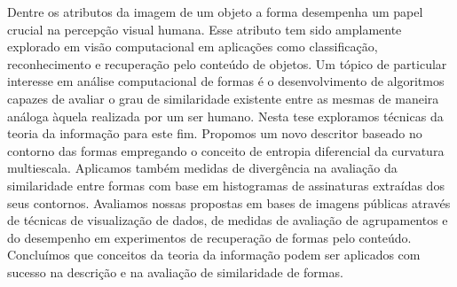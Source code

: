 
Dentre os atributos da imagem de um objeto a forma desempenha um papel crucial na percepção visual humana. Esse atributo tem sido amplamente explorado em visão computacional em aplicações como classificação, reconhecimento e recuperação pelo conteúdo de objetos. Um tópico de particular interesse em análise computacional de formas é o desenvolvimento de algoritmos capazes de avaliar o grau de similaridade existente entre as mesmas de maneira análoga àquela realizada por um ser humano. Nesta tese exploramos técnicas da teoria da informação para este fim. Propomos um novo descritor baseado no contorno das formas empregando o conceito de entropia diferencial da curvatura multiescala. Aplicamos também medidas de divergência na avaliação da similaridade entre formas com base em histogramas de assinaturas extraídas dos seus contornos. Avaliamos nossas propostas em bases de imagens públicas através de técnicas de visualização de dados, de medidas de avaliação de agrupamentos e do desempenho em experimentos de recuperação de formas pelo conteúdo. Concluímos que conceitos da teoria da informação podem ser aplicados com sucesso na descrição e na avaliação de similaridade de formas.

\begin{comment}
A popularização dos dispositivos portáteis de aquisição de imagens tem contribuído para um grande volume de informação multimídia disponível na internet. Dada a limitação dos tradicionais motores de busca em organizar e acessar tal volume de informação, os sistemas de recuperação de imagens através do conteúdo (\emph{CBIR}) despontam como uma proposta promissora para essa finalidade. Esses sistemas realizam buscas por imagens a partir do conteúdo visual para recuperar aquelas que sejam de interesse do usuário. Dois tópicos são de grande relevância em \emph{CBIR}: os métodos de extração de características das imagens e as medidas para avaliação de similaridade. Divergentes estocásticos são funcionais que medem a similaridade entre distribuições de probabilidades. Embora frequentemente aplicados em estatística, teoria da informação e processamento de sinais, a aplicação de divergentes em \emph{CBIR} tem sido pouco explorado. Este trabalho se propõe a investigar a aplicação de tais medidas na avaliação de similaridade de imagens através de características extraídas do contorno da forma. Tendo como descritores os histogramas de assinaturas do contorno das formas, foram conduzidos experimentos de recuperação de imagens pelo conteúdo em bases de imagens binárias empregando-se tais medidas. Os resultados dessa investigação demonstram que a avaliação de similaridade de formas em experimentos \emph{CBIR} através de divergentes é viável.         
\end{comment}
